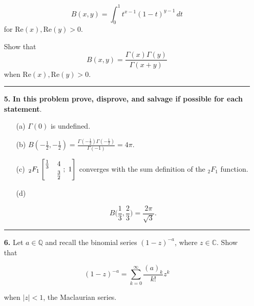 \documentclass[12pt]{amsart}
\theoremstyle{definition}
\theoremstyle{remark}
\numberwithin{equation}{section}
\def\C{\mathbb C}
\def\Q{{\mathbb Q}}
\def\C{\mathbb{C}}
\def\Q{\mathbb{Q}}
\newcommand*\HYPERskip{&}
\newcommand*\pFq{
\begingroup
\catcode`\,\active
\def ,{\HYPERskip}%
\doHyper
}
\def\doHyper#1#2#3#4#5{%
\, _{#1}F_{#2}\left[\begin{matrix}#3 \smallskip \\  #4\end{matrix} \; ; \; #5\right]%
\endgroup
}
\begin{document}
\begin{itemize}
$$B(x,y) = \int_{0}^{1} t^{x-1}(1-t)^{y-1} \, dt$$ for $\text{Re}(x), \text{Re}(y) > 0$.

\vspace{6mm}

Show that $$B(x,y) = \frac{\Gamma(x)\Gamma(y)}{\Gamma(x+y)}$$ when $\text{Re}(x), \text{Re}(y) > 0$.

\vspace{4mm}

\hrule{}

\vspace{8mm}

\item[\textbf{5.}] \textbf{In this problem prove, disprove, and salvage if possible for each statement}.

\vspace{4mm}

\begin{itemize}
\item[(a)] $\Gamma(0)$ is undefined.
\vspace{3mm}

\item[(b)] $B(-\frac{1}{2}, -\frac{1}{2}) = \frac{\Gamma(-\frac{1}{2})\Gamma(-\frac{1}{2})}{\Gamma(-1)} = 4 \pi$.
\vspace{3mm}

\item[(c)] $\pFq{2}{1}{\frac{1}{3}&4}{&\frac{3}{2}}{1}$ converges with the sum definition of the $_{2}F_{1}$ function.
\vspace{3mm}

\item[(d)] 

$$B \bigg(\frac{1}{3}, \frac{2}{3}\bigg) = \frac{2\pi}{\sqrt{3}}.$$
\vspace{3mm}


\end{itemize}

\vspace{4mm}

\hrule{}

\vspace{8mm}

\item[\textbf{6.}] Let $a \in \Q$ and recall the binomial series $(1-z)^{-a}$, where $z \in \C$. Show that 

$$(1-z)^{-a} = \sum_{k=0}^{\infty} \frac{(a)_{k}}{k!} z^{k}$$

when $|z| < 1$, the Maclaurian series.


\vspace{4mm}


\end{itemize}
\end{document}
